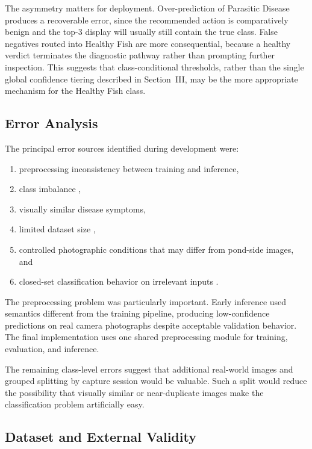 \documentclass[conference]{IEEEtran}
\begin{document}
The asymmetry matters for deployment. Over-prediction of Parasitic Disease produces a recoverable error, since the recommended action is comparatively benign and the top-3 display will usually still contain the true class. False negatives routed into Healthy Fish are more consequential, because a healthy verdict terminates the diagnostic pathway rather than prompting further inspection. This suggests that class-conditional thresholds, rather than the single global confidence tiering described in Section~III, may be the more appropriate mechanism for the Healthy Fish class.

\subsection{Error Analysis}

The principal error sources identified during development were:

\begin{enumerate}
    \item preprocessing inconsistency between training and inference,
    \item class imbalance \cite{b3},
    \item visually similar disease symptoms,
    \item limited dataset size \cite{b2},
    \item controlled photographic conditions that may differ from pond-side images, and
    \item closed-set classification behavior on irrelevant inputs \cite{b25}.
\end{enumerate}

The preprocessing problem was particularly important. Early inference used semantics different from the training pipeline, producing low-confidence predictions on real camera photographs despite acceptable validation behavior. The final implementation uses one shared preprocessing module for training, evaluation, and inference.

The remaining class-level errors suggest that additional real-world images and grouped splitting by capture session would be valuable. Such a split would reduce the possibility that visually similar or near-duplicate images make the classification problem artificially easy.

\subsection{Dataset and External Validity}
\end{document}
